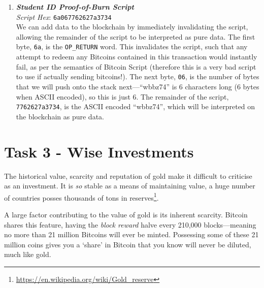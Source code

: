 \documentclass[11pt]{article}
\begin{document}
\begin{enumerate}
\item \textbf{\textit{Student ID Proof-of-Burn Script}}\\
\textit{Script Hex}: \texttt{6a067762627a3734}\\
We can add data to the blockchain by immediately invalidating the script, allowing the remainder of the script to be interpreted as pure data.
The first byte, \texttt{6a}, is the \texttt{OP\_RETURN} word. This invalidates the script, such that any attempt to redeem any Bitcoins contained in this transaction would instantly fail, as per the semantics of Bitcoin Script (therefore this is a very bad script to use if actually sending bitcoins!).
The next byte, \texttt{06}, is the number of bytes that we will push onto the stack next---``wbbz74'' is 6 characters long (6 bytes when ASCII encoded), so this is just 6. 
The remainder of the script, \texttt{7762627a3734}, is the ASCII encoded ``wbbz74'', which will be interpreted on the blockchain as pure data.

\end{enumerate}

\section*{Task 3 - Wise Investments}


The historical value, scarcity and reputation of gold make it difficult to criticise as an investment. It is \textit{so} stable as a means of maintaining value, a huge number of countries posses thousands of tons in reserves\footnote{\url{https://en.wikipedia.org/wiki/Gold_reserve}}.

A large factor contributing to the value of gold is its inherent scarcity. Bitcoin shares this feature, having the \textit{block reward} halve every 210,000 blocks---meaning no more than 21 million Bitcoins will ever be minted. Possessing some of these 21 million coins gives you a `share' in Bitcoin that you know will never be diluted, much like gold.
\end{document}
